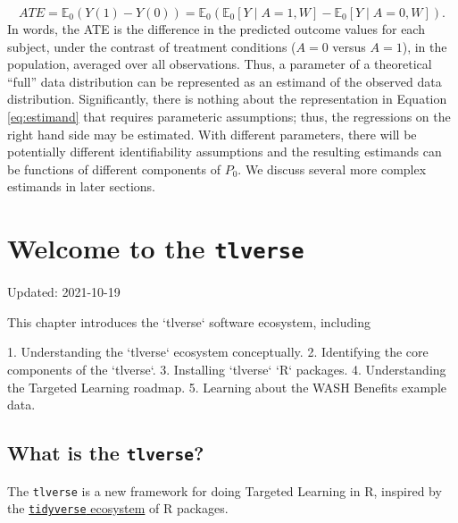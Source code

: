 \documentclass[
  12pt, krantz2,
]{krantz}
\newcommand{\passthrough}[1]{#1}
\theoremstyle{definition}
\theoremstyle{definition}
\theoremstyle{definition}
\newcommand{\E}{\mathbb{E}}
\newcommand{\1}{\mathbbm{1}}
\begin{document}
\begin{equation}
  ATE = \E_0(Y(1) - Y(0)) = \E_0
    \left(\E_0[Y \mid A = 1, W] - \E_0[Y \mid A = 0, W]\right).
  \label{eq:estimand}
\end{equation}
In words, the ATE is the difference in the predicted outcome values for each
subject, under the contrast of treatment conditions (\(A = 0\) versus \(A = 1\)),
in the population, averaged over all observations. Thus, a parameter of a
theoretical ``full'' data distribution can be represented as an estimand of the
observed data distribution. Significantly, there is nothing about the
representation in Equation \eqref{eq:estimand} that requires parameteric
assumptions; thus, the regressions on the right hand side may be estimated.
With different parameters, there will be potentially different identifiability
assumptions and the resulting estimands can be functions of different components
of \(P_0\). We discuss several more complex estimands in later sections.

\hypertarget{tlverse}{%
\chapter{\texorpdfstring{Welcome to the \texttt{tlverse}}{Welcome to the tlverse}}\label{tlverse}}

Updated: 2021-10-19

\begin{VT1}



This chapter introduces the `tlverse` software ecosystem, including

1. Understanding the `tlverse` ecosystem conceptually.
2. Identifying the core components of the `tlverse`.
3. Installing `tlverse` `R` packages.
4. Understanding the Targeted Learning roadmap.
5. Learning about the WASH Benefits example data.

\end{VT1}

\hypertarget{what-is-the-tlverse}{%
\section*{\texorpdfstring{What is the \texttt{tlverse}?}{What is the tlverse?}}\label{what-is-the-tlverse}}


The \passthrough{\lstinline!tlverse!} is a new framework for doing Targeted Learning in R, inspired by
the \href{https://tidyverse.org}{\passthrough{\lstinline!tidyverse!} ecosystem} of R packages.
\end{document}
